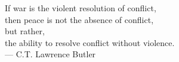\begin{flushright}
If war is the violent resolution of conflict,\\
then peace is not the absence of conflict,\\ 
but rather,\\
the ability to resolve conflict without violence.\\
--- C.T. Lawrence Butler
\end{flushright}